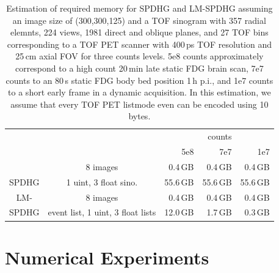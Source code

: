\begin{table}
\begin{center}
\footnotesize
\begin{tabular}{ c c r r r}
         &                       &            & counts      & \\ 
         &                       & 5e8        & 7e7         & 1e7 \\ \hline
         & 8 images              &   0.4\,GB  &   0.4\,GB   &   0.4\,GB \\
SPDHG    & 1 uint, 3 float sino.&  55.6\,GB  &  55.6\,GB   &  55.6\,GB \\ \hline
LM-      & 8 images              &   0.4\,GB  &   0.4\,GB   &   0.4\,GB \\
SPDHG    & event list, 1 uint, 3 float lists &  12.0\,GB  &   1.7\,GB   &   0.3\,GB
\end{tabular}
\end{center}
\caption{Estimation of required memory for SPDHG and LM-SPDHG assuming an image size of (300,300,125)
         and a TOF sinogram with 357 radial elemnts, 224 views, 1981 direct and oblique planes, 
         and 27 TOF bins corresponding to a TOF PET scanner with 400\,ps TOF
         resolution and 25\,cm axial FOV for three counts levels. 
         5e8 counts approximately correspond to a high count 20\,min late static FDG brain scan, 
         7e7 counts to an 80\,s static FDG body bed position 1\,h p.i., 
         and 1e7 counts to a short early frame in a dynamic acquisition.
         In this estimation, we assume that every TOF PET listmode even can be encoded using 10 bytes.}
\label{tab:mem}
\end{table}


\section{Numerical Experiments}


